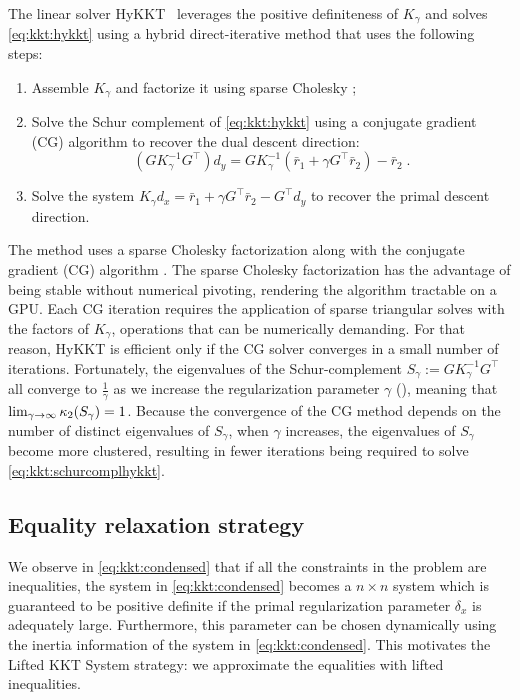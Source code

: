 The linear solver HyKKT~\cite{regev2023hykkt}
leverages the positive definiteness of $K_\gamma$ and solves
\eqref{eq:kkt:hykkt} using a hybrid direct-iterative method
that uses the following steps:
\begin{enumerate}
  \item Assemble $K_\gamma$ and factorize it using sparse Cholesky ;
  \item Solve the Schur complement of \eqref{eq:kkt:hykkt} using a conjugate gradient (CG)
    algorithm to recover the dual descent direction:
    \begin{equation}
      \label{eq:kkt:schurcomplhykkt}
      (G K_\gamma^{-1} G^\top) d_y = G K_\gamma^{-1} (\bar{r}_1 + \gamma G^\top \bar{r}_2) - \bar{r}_2 \; .
    \end{equation}
  \item Solve the system $K_\gamma d_x = \bar{r}_1 + \gamma G^\top \bar{r}_2 - G^\top d_y$
    to recover the primal descent direction.
\end{enumerate}
The method uses a sparse Cholesky factorization along with the conjugate gradient (CG) algorithm \cite{hestenes-stiefel-1952}.
The sparse Cholesky factorization has the advantage of being stable without
numerical pivoting, rendering the algorithm tractable on a GPU.
Each CG iteration requires the application of sparse triangular solves with the
factors of $K_\gamma$, operations that can be numerically demanding. For that reason,
HyKKT is efficient only if the CG solver converges in a small number of iterations.
Fortunately, the eigenvalues of the Schur-complement $S_\gamma := G K_\gamma^{-1} G^\top$
all converge to $\frac{1}{\gamma}$ as we increase the regularization parameter
$\gamma$ (\cite[Theorem 4]{regev2023hykkt}), meaning that $\lim_{\gamma \to \infty} \kappa_2(S_\gamma) = 1$.
Because the convergence of the CG method depends on the number of distinct eigenvalues of $S_{\gamma}$, when $\gamma$ increases, the eigenvalues of $S_{\gamma}$ become more clustered, resulting in fewer iterations being required to solve \eqref{eq:kkt:schurcomplhykkt}.

\subsection{Equality relaxation strategy}
\label{sec:kkt:sckkt}

We observe in \eqref{eq:kkt:condensed} that if all the constraints in the problem are inequalities, the system in \eqref{eq:kkt:condensed} becomes a $n \times n$ system which is guaranteed to be positive definite if the primal regularization parameter $\delta_x$ is adequately large. Furthermore, this parameter can be chosen dynamically using the inertia information of the system in \eqref{eq:kkt:condensed}. This motivates the Lifted KKT System strategy: we approximate the equalities with lifted inequalities.

